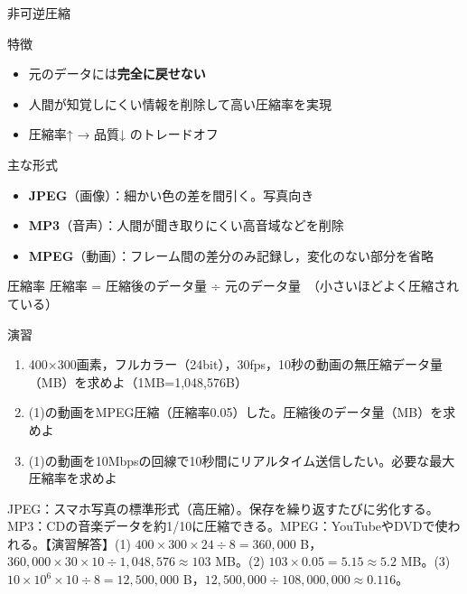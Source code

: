 \documentclass[aspectratio=43,professionalfonts,handout,10pt]{beamer}
\begin{document}
\begin{frame}[shrink=20]{非可逆圧縮}
  \begin{block}{特徴}
    \small
    \begin{itemize}
      \item 元のデータには\textbf{完全に戻せない}
      \item 人間が知覚しにくい情報を削除して高い圧縮率を実現
      \item 圧縮率↑ → 品質↓ のトレードオフ
    \end{itemize}
  \end{block}

  \vfill

  \begin{exampleblock}{主な形式}
    \begin{itemize}
      \item \textbf{JPEG}（画像）：細かい色の差を間引く。写真向き
      \item \textbf{MP3}（音声）：人間が聞き取りにくい高音域などを削除
      \item \textbf{MPEG}（動画）：フレーム間の差分のみ記録し，変化のない部分を省略
    \end{itemize}
  \end{exampleblock}

  \begin{block}{圧縮率}
    \small 圧縮率 = 圧縮後のデータ量 ÷ 元のデータ量　（小さいほどよく圧縮されている）
  \end{block}

  \begin{alertblock}{演習}
    \small
    \begin{enumerate}
      \item[(1)] 400×300画素，フルカラー（24bit），30fps，10秒の動画の無圧縮データ量（MB）を求めよ（1MB=1,048,576B）
      \item[(2)] (1)の動画をMPEG圧縮（圧縮率0.05）した。圧縮後のデータ量（MB）を求めよ
      \item[(3)] (1)の動画を10Mbpsの回線で10秒間にリアルタイム送信したい。必要な最大圧縮率を求めよ
    \end{enumerate}
  \end{alertblock}

  \begin{slidenote}
    \scriptsize JPEG：スマホ写真の標準形式（高圧縮）。保存を繰り返すたびに劣化する。MP3：CDの音楽データを約1/10に圧縮できる。MPEG：YouTubeやDVDで使われる。【演習解答】(1) $400\times300\times24\div8=360{,}000$ B，$360{,}000\times30\times10\div1{,}048{,}576\approx103$ MB。(2) $103\times0.05=5.15\approx5.2$ MB。(3) $10\times10^6\times10\div8=12{,}500{,}000$ B，$12{,}500{,}000\div108{,}000{,}000\approx0.116$。
  \end{slidenote}
\end{frame}
\end{document}
